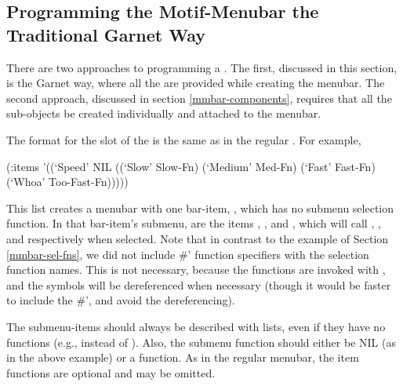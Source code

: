 \subsection{Programming the Motif-Menubar the Traditional Garnet Way}

There are two approaches to programming a .  The first,
discussed in this section, is the Garnet way, where all the 
are provided while creating the menubar.  The second approach, discussed
in section \ref{mmbar-components}, requires that all the sub-objects be
created individually and attached to the menubar.

The format for the  slot of the  is the same as in
the regular .  For example,

\begin{programexample}
(:items '((`Speed' NIL ((`Slow' Slow-Fn) (`Medium' Med-Fn)
			(`Fast' Fast-Fn) (`Whoa' Too-Fast-Fn)))))
\end{programexample}

This  list creates a menubar with one bar-item, ,
which has no submenu selection function.  In that bar-item's submenu,
are the items , ,  and ,
which will call , , 
and  respectively when selected.  Note that in contrast to the
example of Section \ref{mmbar-sel-fns}, we did not include \#' function
specifiers with the selection function names.  This is not necessary, because
the functions are invoked with , and the symbols will be
dereferenced when necessary (though it would be faster to include the \#', and
avoid the dereferencing).

The submenu-items should always be described with lists, even if they
have no functions (e.g.,  instead of ).  Also, the
submenu function should either be NIL (as in the above example) or a function.
As in the regular menubar, the item functions are optional and may be
omitted.



